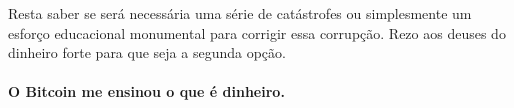Resta saber se será necessária uma série de catástrofes ou simplesmente um esforço educacional monumental para corrigir essa corrupção. Rezo aos deuses do dinheiro forte para que seja a segunda opção.

\paragraph{O Bitcoin me ensinou o que é dinheiro.}

%
%
%
%
